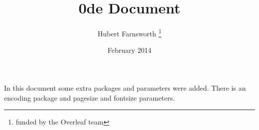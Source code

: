 \documentclass[12pt, letterpaper, twoside]{article}
\title{0de Document}
\author{Hubert Farnsworth \thanks{funded by the Overleaf team}}
\date{February 2014}
\begin{document}
\begin{titlepage}
\maketitle
\end{titlepage}

In this document some extra packages and parameters
were added. There is an encoding package
and pagesize and fontsize parameters.
\end{document}
